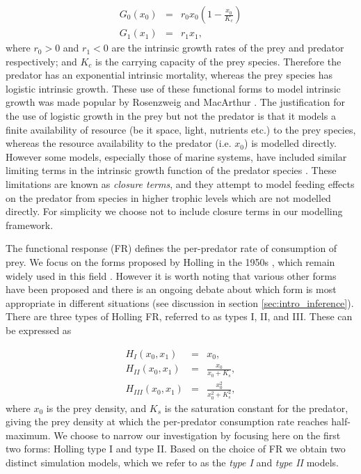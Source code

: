 
\begin{eqnarray}
G_0(x_0) &=& r_0x_0\left(1-\frac{x_0}{K_c}\right)  \\[10pt]
G_1(x_1) &=& r_1x_1,
\label{eq:intrinsic_growth}
\end{eqnarray}
%
where $r_0 > 0$ and $r_1 < 0$ are the intrinsic growth rates of the prey and predator respectively; and $K_c$ is the carrying capacity of the prey species. Therefore the predator has an exponential intrinsic mortality, whereas the prey species has logistic intrinsic growth. These use of these functional forms to model intrinsic growth was made popular by Rosenzweig and MacArthur \cite{rosenzweig1963graphical}. The justification for the use of logistic growth in the prey but not the predator is that it models a finite availability of resource (be it space, light, nutrients etc.) to the prey species, whereas the resource availability to the predator (i.e. $x_0$) is modelled directly. However some models, especially those of marine systems, have included similar limiting terms in the intrinsic growth function of the predator species \cite{mitra2009closure}. These limitations are known as \emph{closure terms}, and they attempt to model feeding effects on the predator from species in higher trophic levels which are not modelled directly. For simplicity we choose not to include closure terms in our modelling framework. 

The functional response (FR) defines the per-predator rate of consumption of prey. We focus on the forms proposed by Holling in the 1950s \cite{holling1959some}, which remain widely used in this field \cite{hastings2013population}. However it is worth noting that various other forms have been proposed and there is an ongoing debate about which form is most appropriate in different situations \cite{barraquand2014functional,jost2000identifying} (see discussion in section \ref{sec:intro_inference}). There are three types of Holling FR, referred to as types I, II, and III. These can be expressed as

\begin{eqnarray}
H_I(x_0,x_1) &=& x_0,  \label{eq:h1} \\[10pt]
H_{II}(x_0,x_1) &=& \frac{x_0}{x_0 + K_s},  \label{eq:ho2} \\[10pt]
H_{III}(x_0,x_1) &=& \frac{x_0^2}{x_0^2 + K_s^2},
\end{eqnarray}
%
where $x_0$ is the prey density, and $K_s$ is the saturation constant for the predator, giving the prey density at which the per-predator consumption rate reaches half-maximum. We choose to narrow our investigation by focusing here on the first two forms: Holling type I and type II. Based on the choice of FR we obtain two distinct simulation models, which we refer to as the \emph{type I} and \emph{type II} models.

